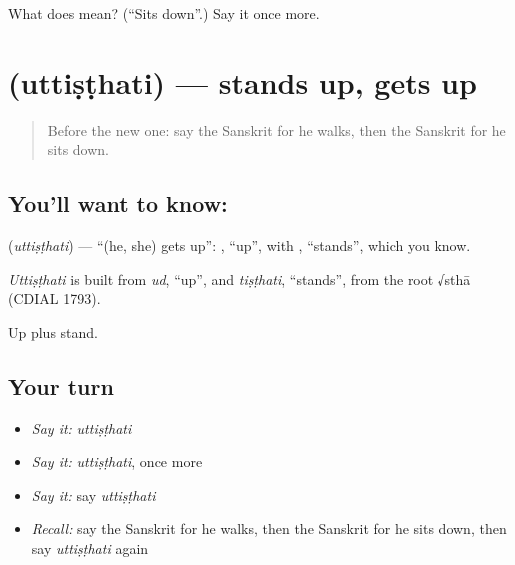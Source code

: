 \begin{tcolorbox}[breakable,colback=teal!4,colframe=teal!35!black,title={Before you move on}]
What does  mean? (\textquotedblleft{}Sits down\textquotedblright{}.) Say it once more.
\end{tcolorbox}
\section[\texorpdfstring{\sk{उत्तिष्ठति} (uttiṣṭhati)}{उत्तिष्ठति (uttiṣṭhati)}]{ (uttiṣṭhati) — stands up, gets up}

\label{lesson:SA-C71-standsup}



\begin{quote}
Before the new one: say the Sanskrit for he walks, then the Sanskrit for he sits down.
\end{quote}

\subsection*{You'll want to know: }
\textbf{} (\emph{uttiṣṭhati}) — \textquotedblleft{}(he, she) gets up\textquotedblright{}: \textbf{}, \textquotedblleft{}up\textquotedblright{}, with \textbf{}, \textquotedblleft{}stands\textquotedblright{}, which you know.

\begin{cousinweb}
\emph{Uttiṣṭhati} is built from \emph{ud}, \textquotedblleft{}up\textquotedblright{}, and \emph{tiṣṭhati}, \textquotedblleft{}stands\textquotedblright{}, from the root √sthā (CDIAL 1793).
\end{cousinweb}

\begin{grammarlens}[title={What you've built}]
Up plus stand.
\end{grammarlens}

\subsection*{Your turn}
\begin{itemize}
\raggedright
  \item \emph{Say it:} \emph{uttiṣṭhati}
  \item \emph{Say it:} \emph{uttiṣṭhati}, once more
  \item \emph{Say it:} say \emph{uttiṣṭhati}
  \item \emph{Recall:} say the Sanskrit for he walks, then the Sanskrit for he sits down, then say \emph{uttiṣṭhati} again
\end{itemize}

